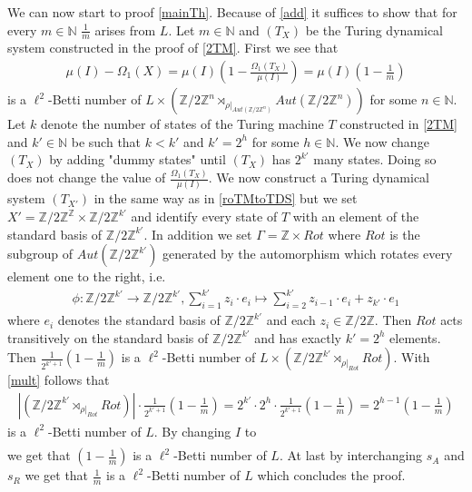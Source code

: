 \documentclass[12pt,a4paper]{scrartcl}
\numberwithin{equation}{section}
\newcommand{\Z}{\mathbb{Z}} %
\newcommand{\N}{\mathbb{N}} %
\newcommand{\2}{\mathbb{Z} / 2 \mathbb{Z}}
\newcommand{\1}{\bar{1}}
\newcommand{\0}{\bar{0}}
\begin{document}
We can now start to proof \ref{mainTh}. Because of \ref{add} it suffices to show that for every $m \in \N$ $\frac{1}{m}$ arises from $L$. Let $m \in \N$  and $(T_X)$ be the Turing dynamical system constructed in the proof of \ref{2TM}. First we see that
\begin{align*}
	\mu (I) - \Omega_1(X) = \mu (I) (1 - \frac{\Omega_1(T_X)}{\mu(I)}) = \mu (I) (1 - \frac{1}{m})
\end{align*}
is a $\ell^2$-Betti number of $L \times (\2^n \rtimes_{\rho|_{Aut(\2^n)}} Aut(\2^n))$ for some $n \in \N$. Let $k$ denote the number of states of the Turing machine $T$ constructed in \ref{2TM} and $k' \in \N$ be such that $k < k'$ and $k' = 2^{h}$ for some $h \in \N$. We now change $(T_X)$ by adding "dummy states" until $(T_X)$ has $2^{k'}$ many states. Doing so does not change the value of $\frac{\Omega_1(T_X)}{\mu(I)}$. We now construct a Turing dynamical system $(T_{X'})$ in the same way as in \ref{roTMtoTDS} but we set $X' = \2^\Z \times \2^{k'}$ and identify every state of $T$ with an element of the standard basis of $\2^{k'}$. In addition we set $\Gamma = \Z \times Rot$ where $Rot$ is the subgroup of $Aut(\2^{k'})$ generated by the automorphism which rotates every element one to the right, i.e.
\begin{align*}
	\phi : \2^{k'} \to \2^{k'}, \sum_{i =1}^{k'}z_i \cdot e_i \mapsto \sum_{i =2}^{k'}z_{i - 1} \cdot e_i + z_{k'} \cdot e_1
\end{align*}
where $e_i$ denotes the standard basis of $\2^{k'}$ and each $z_i \in \2$. Then $Rot$ acts transitively on the standard basis of $\2^{k'}$ and has exactly $k' = 2^{h}$ elements. Then $\frac{1}{2^{k' + 1}} (1 - \frac{1}{m})$ is a $\ell^2$-Betti number of $L \times (\2^{k'} \rtimes_{\rho|_{Rot}} Rot)$. With \ref{mult} follows that 
\begin{align*}
	|(\2^{k'} \rtimes_{\rho|_{Rot}} Rot)| \cdot \frac{1}{2^{k' + 1}} (1 - \frac{1}{m}) = 2^{k'} \cdot 2^h \cdot \frac{1}{2^{k' + 1}} (1 - \frac{1}{m}) = 2^{h -1} (1 - \frac{1}{m})
\end{align*}
is a $\ell^2$-Betti number of $L$. By changing $I$ to
\begin{align*}
	[\1^{h-1} \underline{\1}][s_I]
\end{align*}
we get that $(1 - \frac{1}{m})$ is a $\ell^2$-Betti number of $L$. At last by interchanging $s_A$ and $s_R$ we get that $\frac{1}{m}$ is a $\ell^2$-Betti number of $L$ which concludes the proof.
\end{document}
